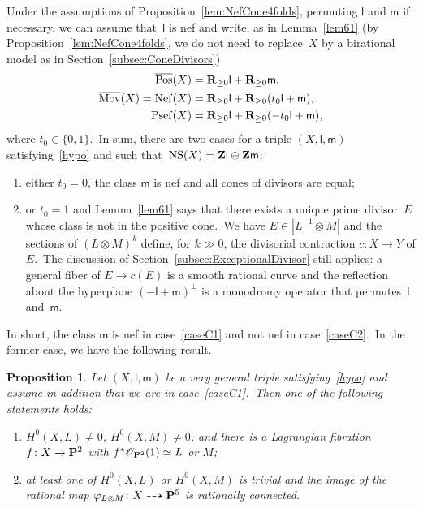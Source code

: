 \documentclass[12pt]{amsart}
\def\cO{\mathscr{O}}
\def\Z{{\bf Z}}
\def\R{{\bf R}}
\def\P{{\bf P}}
\def\phi{\varphi}
\DeclareMathOperator{\Mov}{\overline{Mov}}
\DeclareMathOperator{\Nef}{Nef}
\DeclareMathOperator{\NS}{NS}
\def\otp{}
\DeclareMathOperator{\Pos}{\overline{Pos}}
\DeclareMathOperator{\Psef}{Psef}
\def\isom{\simeq}
\def\dra{\dashrightarrow}
\newtheorem{prop}[lemm]{Proposition}
\theoremstyle{remark}
\def\lll{\ensuremath{\mathsf l}}
\def\mm{\ensuremath{\mathsf m}}
\begin{document}
Under the assumptions of Proposition~\ref{lem:NefCone4folds},  permuting $\lll$ and $\mm$ if necessary, we can assume that~$\lll$ is nef  and write, as in Lemma~\ref{lem61} (by Proposition~\ref{lem:NefCone4folds}, we do not need to replace~$X$ by a birational model  as in Section~\ref{subsec:ConeDivisors})
\begin{align}
\Pos(X) &=\R_{\ge 0}\lll + \R_{\ge 0} \mm,\nonumber\\
\Mov(X)=\Nef(X)&=\R_{\ge 0}\lll + \R_{\ge 0} (t_0\lll+\mm),\label{cones}\\
\Psef(X)&=\R_{\ge 0}\lll + \R_{\ge 0} (-t_0\lll+\mm),\nonumber
\end{align}
where $t_0\in\{0,1\}$.\
In sum, there are two cases for a  triple $(X,\lll,\mm)$ satisfying~\eqref{hypo} and such that~$\NS(X)=\Z\lll\oplus\Z\mm$:
\begin{enumerate}[label={\rm(C\arabic*)},ref=(C\arabic*)]
\item\label{caseC1} either $t_0=0$, the class $\mm$ is nef and all cones of divisors are equal;
\item\label{caseC2} or $t_0=1$ and Lemma~\ref{lem61} says that there exists a unique prime divisor~$E$ whose class is not in the positive cone.\ We have $E\in |L^{-1}\otimes M|$ and the sections of \mbox{$(L\otimes M)^{\otp k}$} define, for $k\gg 0$, the divisorial contraction $c\colon X\to Y$ of $E$.\ The discussion of Section~\ref{subsec:ExceptionalDivisor} still applies: a general fiber of $E\to c(E)$ is a smooth rational curve and the reflection about the hyperplane $(-\lll+\mm)^\bot$ is a monodromy operator that permutes~$\lll$ and~$\mm$.
\end{enumerate}

In short, the class $\mm$ is nef in case~\ref{caseC1} and not nef in case~\ref{caseC2}.\
In the former case, we have the following result.

\begin{prop}\label{prop:CaseC1}
Let $(X,\lll,\mm)$ be a very general triple satisfying~\eqref{hypo}
and assume in addition that we are in case~{\rm\ref{caseC1}}.\
 Then one of the following  statements holds:
\begin{enumerate}[{\rm (a)}]
       \item  $H^0(X,L)\ne 0$, $H^0(X,M)\ne 0$, and  there is a Lagrangian fibration \mbox{$f\colon X\to\P^2$} with $f^*{\cO_{\P^2}}(1)\isom L$ or $M$;\label{prop64a}  
    \item  at least one of $H^0(X,L)$ or $H^0(X,M)$ is trivial and  the image of the rational map $\phi_{L\otimes M}\colon X\dra \P^5$ is rationally connected.\label{prop64b}
\end{enumerate}
\end{prop}
\end{document}
